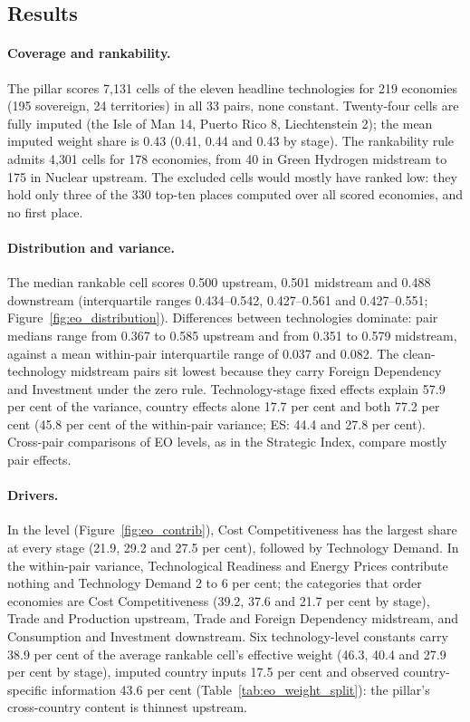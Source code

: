 \subsection{Results}\label{subsec:eo_results}

\paragraph{Coverage and rankability.} The pillar scores 7{,}131 cells of the eleven headline
technologies for 219 economies (195 sovereign, 24 territories) in all 33 pairs, none constant.
Twenty-four cells are fully imputed (the Isle of Man 14, Puerto Rico 8, Liechtenstein 2); the mean
imputed weight share is 0.43 (0.41, 0.44 and 0.43 by stage). The rankability rule admits 4{,}301
cells for 178 economies, from 40 in Green Hydrogen midstream to 175 in Nuclear upstream. The
excluded cells would mostly have ranked low: they hold only three of the 330 top-ten places
computed over all scored economies, and no first place.

\paragraph{Distribution and variance.} The median rankable cell scores 0.500 upstream, 0.501
midstream and 0.488 downstream (interquartile ranges 0.434--0.542, 0.427--0.561 and 0.427--0.551;
Figure~\ref{fig:eo_distribution}). Differences between technologies dominate: pair medians range
from 0.367 to 0.585 upstream and from 0.351 to 0.579 midstream, against a mean within-pair
interquartile range of 0.037 and 0.082. The clean-technology midstream pairs sit lowest because
they carry Foreign Dependency and Investment under the zero rule. Technology-stage fixed effects
explain 57.9 per cent of the variance, country effects alone 17.7 per cent and both 77.2 per cent
(45.8 per cent of the within-pair variance; ES: 44.4 and 27.8 per cent). Cross-pair comparisons of
EO levels, as in the Strategic Index, compare mostly pair effects.

\paragraph{Drivers.} In the level (Figure~\ref{fig:eo_contrib}), Cost Competitiveness has the
largest share at every stage (21.9, 29.2 and 27.5 per cent), followed by Technology Demand. In the
within-pair variance, Technological Readiness and Energy Prices contribute nothing and Technology
Demand 2 to 6 per cent; the categories that order economies are Cost Competitiveness (39.2, 37.6 and
21.7 per cent by stage), Trade and Production upstream, Trade and Foreign Dependency midstream, and
Consumption and Investment downstream. Six technology-level constants carry 38.9 per cent of the
average rankable cell's effective weight (46.3, 40.4 and 27.9 per cent by stage), imputed country
inputs 17.5 per cent and observed country-specific information 43.6 per cent
(Table~\ref{tab:eo_weight_split}): the pillar's cross-country content is thinnest upstream.

